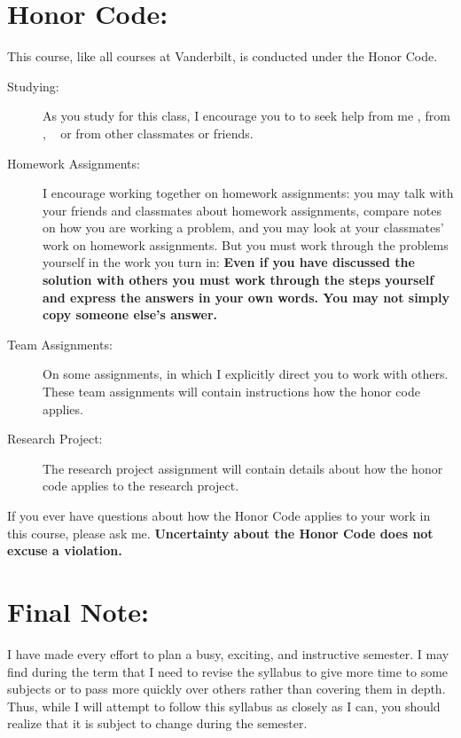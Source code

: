 \documentclass[11pt,twoside]{jgsyllabus}\usepackage[]{graphicx}\usepackage[]{color}
\begin{document}
\section{Honor Code:}
This course, like all courses at Vanderbilt, is conducted under the Honor Code.
\begin{description}
\item[Studying:] As you study for this class, I encourage you to to seek help from me%
\ifTA
, from \TaTitle,
\else
\
\fi
or from other classmates or friends.

\item[Homework Assignments:] I encourage working together
on homework assignments: you may talk with your friends and classmates about
homework assignments, compare notes on how you are working a problem, and you
may look at your classmates' work on homework assignments.
But you must work through the problems yourself
in the work you turn in:
\textbf{Even if you have discussed the solution with others you must work
through the steps yourself and express the answers in your own words. You may
not simply copy someone else's answer.}

\item[Team Assignments:] On some assignments, in which I explicitly direct you
to work with others.
These team assignments will contain instructions how the honor code applies.

\item[Research Project:] The research project assignment will contain details
about how the honor code applies to the research project.
\end{description}

If you ever
have questions about how the Honor Code applies to your work
in this course, please ask me.
\textbf{Uncertainty about the Honor Code does not excuse a violation.}
\section{Final Note:}
I have made every effort to plan a busy, exciting, and instructive semester.
I may find during the term that I need to revise the syllabus to give more time
to some subjects or to pass more quickly over others rather than covering them
in depth.
Thus, while I will attempt to follow this syllabus as closely as I can,
you should realize that it is subject to change during the semester.
%
%
\iftrue

\fi
%
%
%
%
%
%
%
\end{document}
